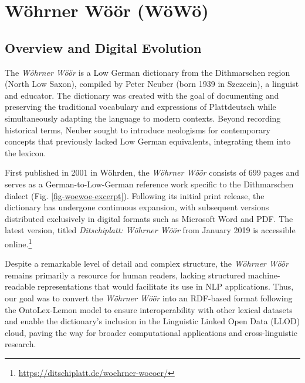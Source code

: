 \section{Wöhrner Wöör (WöWö)}

\subsection{Overview and Digital Evolution}

The \emph{Wöhrner Wöör} is a Low German dictionary from the Dithmarschen region (North Low Saxon), compiled by Peter Neuber (born 1939 in Szczecin), a linguist and educator. The dictionary was created with the goal of documenting and preserving the traditional vocabulary and expressions of Plattdeutsch while simultaneously adapting the language to modern contexts. Beyond recording historical terms, Neuber sought to introduce neologisms for contemporary concepts that previously lacked Low German equivalents, integrating them into the lexicon.

First published in 2001 in Wöhrden, the \emph{Wöhrner Wöör} consists of 699 pages and serves as a German-to-Low-German reference work specific to the Dithmarschen dialect (Fig. \ref{fig-woewoe-excerpt}). Following its initial print release, the dictionary has undergone continuous expansion, with subsequent versions distributed exclusively in digital formats such as Microsoft Word and PDF. %
The latest version, titled \emph{Ditschiplatt: Wöhrner Wöör} from January 2019 is accessible online.\footnote{\url{https://ditschiplatt.de/woehrner-woeoer/}}


Despite a remarkable level of detail and complex structure, %
the \emph{Wöhrner Wöör} remains primarily a resource for human readers, lacking structured machine-readable representations that would facilitate its use in NLP applications. Thus, our goal was to convert the \emph{Wöhrner Wöör} into an RDF-based format following the OntoLex-Lemon model to ensure interoperability with other lexical datasets and enable the dictionary’s inclusion in the Linguistic Linked Open Data (LLOD) cloud, paving the way for broader computational applications and cross-linguistic research.

